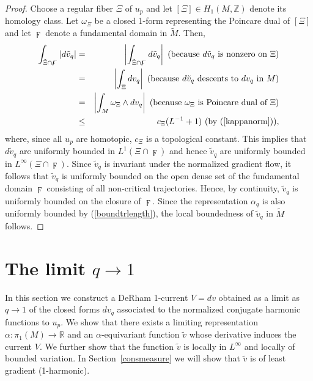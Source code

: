 \documentclass{ip-journal}
\theoremstyle{definition}
\numberwithin{equation}{section}
\newcommand{\R}{\mathbb R}
\newcommand{\Z}{\mathbb Z}
\begin{document}
\begin{proof} Choose a regular fiber $\Xi$ of $u_p$ and let $[\Xi] \in H_1(M, \Z)$ denote its homology class. Let $ \omega_\Xi$ be a  closed 1-form representing the Poincare dual of $[\Xi]$ 
%
and let  $ \digamma$ denote a fundamental domain in $\tilde M$. Then,
\begin{eqnarray*}
\int_{\tilde \Xi \cap \digamma }|d \tilde v_q| &=& \left |\int_{\tilde \Xi \cap \digamma} d \tilde v_q \right| \ (\mbox{because $d \tilde v_q$ is nonzero on $\Xi$})\\
&=& \left |\int_{ \Xi } d  v_q \right| \ (\mbox{because $d \tilde v_q$ descents to $d v_q$ in $M$})\\
&=&\left | \int_{M } \omega_\Xi \wedge d  v_q \right| \ (\mbox{because $\omega_\Xi$ is  Poincare dual of $\Xi$})\\
&\leq &c_\Xi(L^{-1}+1) \ (\mbox{by} \ (\ref{kappanorm})),
\end{eqnarray*}
where, since all $u_p$ are homotopic, $c_\Xi$ is a topological constant.
This implies that $d\tilde v_q$ are uniformly bounded in $L^1(\Xi \cap \digamma)$ and hence  $\tilde v_q$ are uniformly bounded in $L^\infty(\Xi \cap \digamma)$.
Since $\tilde v_q$ is invariant under the normalized gradient flow, it follows that $\tilde v_q$ is uniformly bounded on the open dense set of the fundamental domain $\digamma$ consisting of all non-critical trajectories. Hence, by continuity, $\tilde v_q$  is uniformly bounded on the closure of $\digamma$. Since the representation $\alpha_q$ is also uniformly bounded by (\ref{boundtrlength}), the local boundedness of $\tilde v_q$ in $\tilde M$ follows.
\end{proof}


\section{The limit $q \rightarrow 1$}\label{qgoesto1}
In this section we construct a DeRham 1-current $V=dv$ obtained as a limit as $q \rightarrow 1$ of the closed forms $dv_q$ associated to the normalized conjugate harmonic functions to $u_p$. We  show that there exists a limiting representation $\alpha: \pi_1(M) \rightarrow \R$ and an $\alpha$-equivariant function $\tilde v$ whose derivative induces the current $V$. We further show that the function $\tilde v$ is locally in $L^\infty$ and locally of bounded variation. In Section~\ref{consmeasure} we will show that $\tilde v$ is  of least gradient (1-harmonic).
\end{document}
